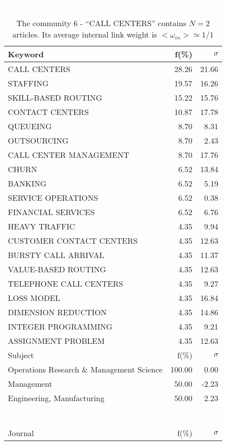 \documentclass[a4paper,11pt]{report}
\begin{document}
\begin{landscape}
\begin{table}[!ht]
\caption{The community 6 - ``CALL CENTERS'' contains $N = 2$ articles. Its average internal link weight is $<\omega_{in}> \simeq 1/1$ }
\textcolor{white}{aa}\\
{\scriptsize\begin{tabular}{|l r r|}
\hline
Keyword & f(\%) & $\sigma$\\
\hline
CALL CENTERS & 28.26 & 21.66\\
STAFFING & 19.57 & 16.26\\
SKILL-BASED ROUTING & 15.22 & 15.76\\
CONTACT CENTERS & 10.87 & 17.78\\
QUEUEING & 8.70 & 8.31\\
OUTSOURCING & 8.70 & 2.43\\
CALL CENTER MANAGEMENT & 8.70 & 17.76\\
CHURN & 6.52 & 13.84\\
BANKING & 6.52 & 5.19\\
SERVICE OPERATIONS & 6.52 & 0.38\\
FINANCIAL SERVICES & 6.52 & 6.76\\
HEAVY TRAFFIC & 4.35 & 9.94\\
CUSTOMER CONTACT CENTERS & 4.35 & 12.63\\
BURSTY CALL ARRIVAL & 4.35 & 11.37\\
VALUE-BASED ROUTING & 4.35 & 12.63\\
TELEPHONE CALL CENTERS & 4.35 & 9.27\\
LOSS MODEL & 4.35 & 16.84\\
DIMENSION REDUCTION & 4.35 & 14.86\\
INTEGER PROGRAMMING & 4.35 & 9.21\\
ASSIGNMENT PROBLEM & 4.35 & 12.63\\
\hline
\hline
Subject & f(\%) & $\sigma$\\
\hline
Operations Research \& Management Science & 100.00 & 0.00\\
Management & 50.00 & -2.23\\
Engineering, Manufacturing & 50.00 & 2.23\\
 &  & \\
 &  & \\
 &  & \\
 &  & \\
 &  & \\
 &  & \\
 &  & \\
\hline
\hline
Journal & f(\%) & $\sigma$\\

\end{tabular}}
\end{table}
\end{landscape}
\end{document}
